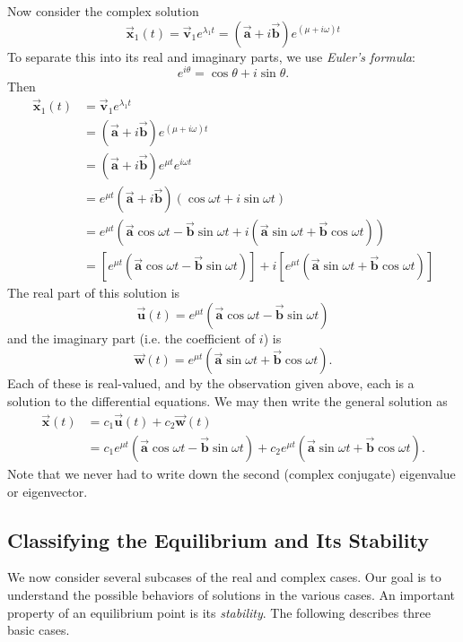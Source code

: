 \documentclass[reqno]{immbook}
\newcommand{\BA}{\vec{\textbf{a}}}
\newcommand{\BB}{\vec{\textbf{b}}}
\newcommand{\BU}{\vec{\textbf{u}}}
\newcommand{\BV}{\vec{\textbf{v}}}
\newcommand{\BW}{\vec{\textbf{w}}}
\newcommand{\BX}{\vec{\textbf{x}}}
\numberwithin{equation}{chapter}
\numberwithin{question}{section}
\numberwithin{theorem}{chapter}
\numberwithin{figure}{chapter}
\theoremstyle{definition}
\begin{document}
Now consider the complex solution
\begin{equation}
  \BX_1(t) = \BV_1 e^{\lambda_1 t}
    = (\BA+i\BB) e^{(\mu + i\omega)t}
\end{equation}
To separate this into its real and imaginary parts, we use
\emph{Euler's formula}:
\begin{equation}
e^{i\theta} = \cos\theta + i \sin\theta.
\end{equation}
Then
\begin{equation}
\begin{split}
  \BX_1(t) & = \BV_1 e^{\lambda_1 t} \\
     & = (\BA+i\BB) e^{(\mu + i\omega)t} \\
     & = (\BA+i\BB)e^{\mu t} e^{i\omega t} \\
     & = e^{\mu t} (\BA+i\BB)(\cos \omega t + i\sin \omega t) \\
     & = e^{\mu t} \left(\BA\cos\omega t - \BB\sin\omega t + i(\BA\sin\omega t + \BB\cos\omega t)\right) \\
     & = \left[e^{\mu t}\left(\BA\cos\omega t - \BB\sin\omega t \right) \right]
         + i \left[e^{\mu t}\left(\BA\sin\omega t + \BB\cos\omega t\right) \right]
\end{split} 
\end{equation}
The real part of this solution is
\begin{equation} 
\BU(t) = e^{\mu t}\left(\BA\cos\omega t - \BB\sin\omega t \right)
\end{equation}
and the imaginary part (i.e. the coefficient of $i$) is
\begin{equation}
\BW(t) = e^{\mu t}\left(\BA\sin\omega t + \BB\cos\omega t\right).
\end{equation}
Each of these is real-valued, and by the observation given
above, each is a solution to the differential equations.
We may then write the general solution as
\begin{equation}
\begin{split}
   \BX(t) & = c_1 \BU(t) + c_2 \BW(t) \\
    &  =  c_1 e^{\mu t}\left(\BA\cos\omega t - \BB\sin\omega t \right)
                 + c_2 e^{\mu t}\left(\BA\sin\omega t + \BB\cos\omega t\right).
\end{split}
\label{eqn:gensolcomplex}
\end{equation}
Note that we never had to write down the second (complex conjugate)
eigenvalue or eigenvector. 

\subsection*{Classifying the Equilibrium and Its Stability}
We now consider several subcases of the real and complex cases.
Our goal is to understand the possible behaviors of solutions
in the various cases.
An important property of an equilibrium point is its
\emph{stability}.
The following describes three basic cases.
\end{document}
